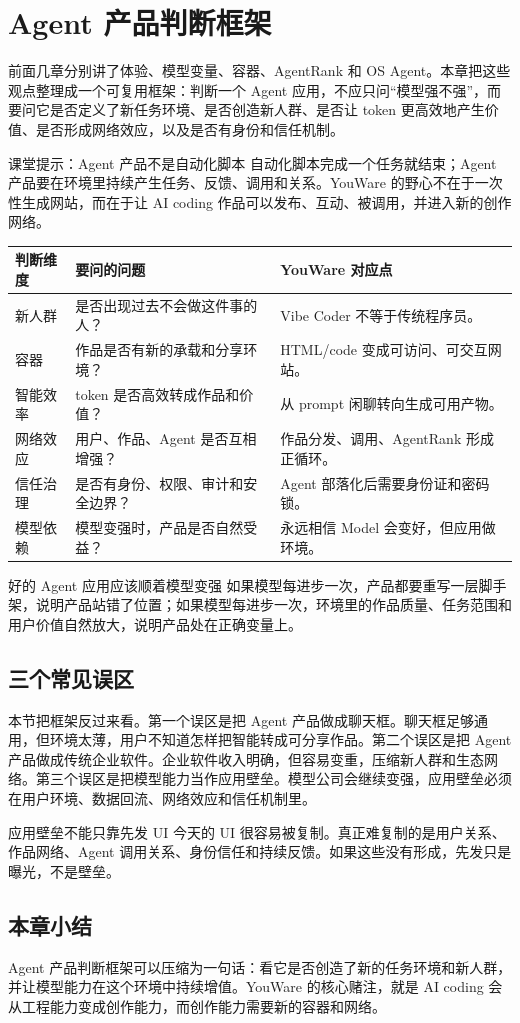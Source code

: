 \section{Agent 产品判断框架}

前面几章分别讲了体验、模型变量、容器、AgentRank 和 OS Agent。本章把这些观点整理成一个可复用框架：判断一个 Agent 应用，不应只问“模型强不强”，而要问它是否定义了新任务环境、是否创造新人群、是否让 token 更高效地产生价值、是否形成网络效应，以及是否有身份和信任机制。

\begin{knowledgebox}{课堂提示：Agent 产品不是自动化脚本}
自动化脚本完成一个任务就结束；Agent 产品要在环境里持续产生任务、反馈、调用和关系。YouWare 的野心不在于一次性生成网站，而在于让 AI coding 作品可以发布、互动、被调用，并进入新的创作网络。
\end{knowledgebox}

\noindent\begin{tabularx}{\textwidth}{p{}p{}X}
\toprule
判断维度 & 要问的问题 & YouWare 对应点 \\
\midrule
新人群 & 是否出现过去不会做这件事的人？ & Vibe Coder 不等于传统程序员。 \\
容器 & 作品是否有新的承载和分享环境？ & HTML/code 变成可访问、可交互网站。 \\
智能效率 & token 是否高效转成作品和价值？ & 从 prompt 闲聊转向生成可用产物。 \\
网络效应 & 用户、作品、Agent 是否互相增强？ & 作品分发、调用、AgentRank 形成正循环。 \\
信任治理 & 是否有身份、权限、审计和安全边界？ & Agent 部落化后需要身份证和密码锁。 \\
模型依赖 & 模型变强时，产品是否自然受益？ & 永远相信 Model 会变好，但应用做环境。 \\
\bottomrule
\end{tabularx}

\begin{importantbox}{好的 Agent 应用应该顺着模型变强}
如果模型每进步一次，产品都要重写一层脚手架，说明产品站错了位置；如果模型每进步一次，环境里的作品质量、任务范围和用户价值自然放大，说明产品处在正确变量上。
\end{importantbox}

\subsection{三个常见误区}

本节把框架反过来看。第一个误区是把 Agent 产品做成聊天框。聊天框足够通用，但环境太薄，用户不知道怎样把智能转成可分享作品。第二个误区是把 Agent 产品做成传统企业软件。企业软件收入明确，但容易变重，压缩新人群和生态网络。第三个误区是把模型能力当作应用壁垒。模型公司会继续变强，应用壁垒必须在用户环境、数据回流、网络效应和信任机制里。

\begin{warningbox}{应用壁垒不能只靠先发 UI}
今天的 UI 很容易被复制。真正难复制的是用户关系、作品网络、Agent 调用关系、身份信任和持续反馈。如果这些没有形成，先发只是曝光，不是壁垒。
\end{warningbox}

\subsection{本章小结}

Agent 产品判断框架可以压缩为一句话：看它是否创造了新的任务环境和新人群，并让模型能力在这个环境中持续增值。YouWare 的核心赌注，就是 AI coding 会从工程能力变成创作能力，而创作能力需要新的容器和网络。

